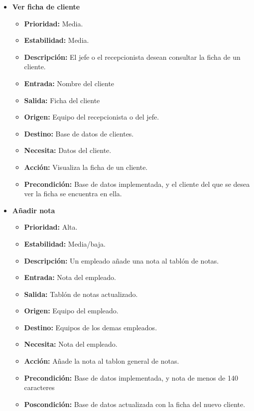\documentclass[spanish,a4paper,11pt, twoside]{report}	%
\begin{document}
\begin{itemize}
\begin{itemize}
		\end{itemize}%

		\item \textbf{Ver ficha de cliente}%

		\begin{itemize}
			\item \textbf{Prioridad: }Media.
			\item \textbf{Estabilidad: }Media.
			\item \textbf{Descripción: }El jefe o el recepcionista desean consultar la ficha de un cliente.
			\item \textbf{Entrada: } Nombre del cliente
			\item \textbf{Salida: }Ficha del cliente
			\item \textbf{Origen: }Equipo del recepcionista o del jefe.
			\item \textbf{Destino: }Base de datos de clientes. 
			\item \textbf{Necesita: }Datos del cliente. 
			\item \textbf{Acción: }Visualiza la ficha de un cliente.
			\item \textbf{Precondición: }Base de datos implementada, y el cliente del que se desea ver la ficha se encuentra en ella.
		\end{itemize}%

		\item \textbf{Añadir nota}  %

		\begin{itemize}
			\item \textbf{Prioridad: }Alta.
			\item \textbf{Estabilidad: }Media/baja.
			\item \textbf{Descripción: }Un empleado añade una nota al tablón de notas.
			\item \textbf{Entrada: } Nota del empleado.
			\item \textbf{Salida: }Tablón de notas actualizado.
			\item \textbf{Origen: }Equipo del empleado.
			\item \textbf{Destino: }Equipos de los demas empleados. 
			\item \textbf{Necesita: }Nota del empleado. 
			\item \textbf{Acción: }Añade la nota al tablon general de notas.
			\item \textbf{Precondición: }Base de datos implementada, y nota de menos de 140 caracteres
			\item \textbf{Poscondición: }Base de datos actualizada con la ficha del nuevo cliente. 



\end{itemize}
\end{itemize}
\end{document}

